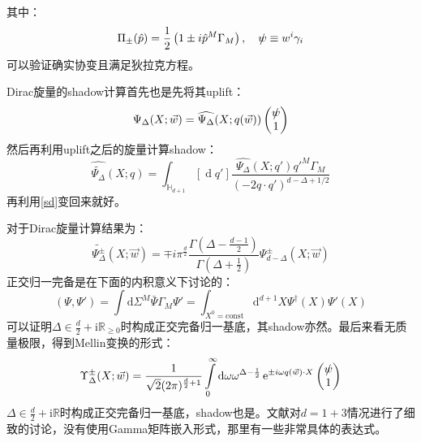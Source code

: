 其中：
\begin{equation}
	\Pi_{\pm}(\hat{p})=\frac{1}{2}\left(1\pm i\hat{p}^M\Gamma_M\right),\quad \slashed{w}\equiv w^i\gamma_i
\end{equation}
可以验证确实协变且满足狄拉克方程\sn{\[\left(\Gamma^M\frac{\partial}{\partial X^M}-m\right)\Psi(X)=0\]}。
\begin{definition}
	Dirac旋量的shadow计算首先也是先将其uplift：
	\begin{equation}\label{sd}
		\Psi_\Delta(X;\vec{w})=\widehat{\Psi_\Delta}(X;q(\vec{w}))\begin{pmatrix}\slashed{w}\\1\end{pmatrix}
	\end{equation}
	然后再利用uplift之后的旋量计算shadow：
	\begin{equation}
		\widehat{\widetilde{\Psi_\Delta}}(X;q)=\int_{\mathbb{H}_{d+1}}[\operatorname{d}q']\frac{\widehat{\Psi_\Delta}(X;q')q'^M\Gamma_M}{(-2q\cdot q')^{d-\Delta+1/2}}
	\end{equation}
	再利用\ref{sd}变回来就好。
\end{definition}
对于Dirac旋量计算结果为：
\begin{equation}
	\widetilde{\Psi_\Delta^\pm}(X;\vec{w})=\mp i\pi^{\frac{d}{2}}\frac{\Gamma\left(\Delta-\frac{d-1}{2}\right)}{\Gamma\left(\Delta+\frac{1}{2}\right)}\Psi_{d-\Delta}^{\pm}(X;\vec{w})
\end{equation}
正交归一完备是在下面的内积意义下讨论的：
\begin{equation}
	\left(\Psi,\Psi'\right)=\int\mathrm{d}\Sigma^M\bar{\Psi}\Gamma_M\Psi'=\int_{X^0=\text{const}}\mathrm{d}^{d+1}X\Psi^\dagger(X)\Psi'(X)
\end{equation}
可以证明$\boxed{\Delta\in\frac{d}{2}+\mathrm{i}\mathbb{R}_{\geq 0}}$时构成正交完备归一基底，其shadow亦然。最后来看无质量极限，得到Mellin变换的形式：
\begin{equation}
	\Upsilon_\Delta^\pm(X;\vec{w})=\frac{1}{\sqrt{2}(2\pi)^{\frac{d}{2}+1}}\int\limits_0^\infty\mathrm{d}\omega\omega^{\Delta-\frac{1}{2}}\operatorname{e}^{\pm i\omega q(\vec{w})\cdot X}\begin{pmatrix}\slashed{w}\\1\end{pmatrix}
\end{equation}
$\boxed{\Delta\in\frac{d}{2}+\mathrm{i}\mathbb{R}}$时构成正交完备归一基底，shadow也是。文献\cite{Narayanan:2020amh}对$d=1+3$情况进行了细致的讨论，没有使用Gamma矩阵嵌入形式，那里有一些非常具体的表达式。
